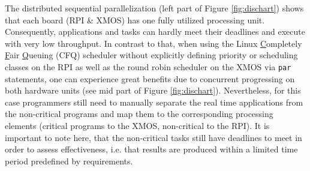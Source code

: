 \documentclass [a4paper,final,conference,10pt]{IDAACS}
\begin{document}
The distributed sequential parallelization (left part of Figure \ref{fig:dischart}) shows that each board (RPI \& XMOS) has one fully utilized processing unit. Consequently, applications and tasks can hardly meet their deadlines and execute with very low throughput. In contrast to that, when using the Linux \underline{C}ompletely \underline{F}air \underline{Q}ueuing (CFQ) scheduler without explicitly defining priority or scheduling classes %
on the RPI as well as the round robin scheduler on the XMOS via \texttt{par} statements, one can experience great benefits due to concurrent progressing on both hardware units (see mid part of Figure \ref{fig:dischart}). Nevertheless, for this case programmers still need to manually separate the real time applications from the non-critical programs and map them to the corresponding processing elements (critical programs to the XMOS, non-critical to the RPI). It is important to note here, that the non-critical tasks still have deadlines to meet in order to assess effectiveness, i.e. that results are produced within a limited time period predefined by requirements.
\end{document}
